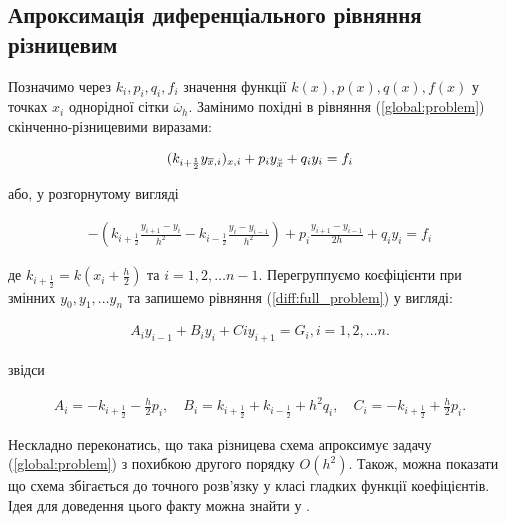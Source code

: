 \subsection{Апроксимація диференціального рівняння різницевим}

Позначимо через \( k_i, p_i, q_i, f_i \) значення функції \( k(x), p(x), q(x), f(x)\) у точках \( x_i \) однорідної сітки \( \overline{\omega}_h \). Замінимо похідні в рівняння (\ref{global:problem}) скінченно-різницевими виразами:

\begin{equation}
\begin{multlined} \label{diff:compact_problem}
(k_{i+\frac{1}{2}} y_{\overline{x}, i})_{x, i} + p_i y_{\accentset{\circ}{x}} + q_iy_i = f_i
\end{multlined}
\end{equation}

або, у розгорнутому вигляді

\begin{equation}
\begin{multlined} \label{diff:full_problem}
-\left( k_{i+\frac{1}{2}} \frac{y_{i+1} - y_i}{h^2} - k_{i-\frac{1}{2}} \frac{y_i - y_{i-1}}{h^2}\right) + p_i \frac{y_{i+1} - y_{i-1}}{2h} + q_iy_i = f_i
\end{multlined}
\end{equation}

де \( k_{i+\frac{1}{2}} = k(x_i + \frac{h}{2})\) та \( i = 1, 2, \dots n-1 \). Перегруппуємо коєфіцієнти при змінних \( y_0, y_1, \dots y_n\) та запишемо рівняння (\ref{diff:full_problem}) у вигляді:

\begin{equation}
\begin{multlined} \label{diff:grouped}
A_iy_{i-1} + B_iy_i + Ciy_{i+1} = G_i, i = 1, 2, \dots n.
\end{multlined}
\end{equation}

звідси

\begin{equation}
\begin{multlined} \label{diff:grouped}
A_i = -k_{i+\frac{1}{2}} - \frac{h}{2}p_i, \quad B_i = k_{i+\frac{1}{2}} + k_{i - \frac{1}{2}} + h^2q_i, \quad C_i = -k_{i+\frac{1}{2}} + \frac{h}{2}p_i.
\end{multlined}
\end{equation}

Нескладно переконатись, що така різницева схема апроксимує задачу (\ref{global:problem}) з похибкою другого порядку \( O(h^2)\). Також, можна показати що схема збігається до точного розв'язку у класі гладких функції коефіцієнтів. Ідея для доведення цього факту можна знайти у \cite[с. 106--108]{Samarskii71}.

